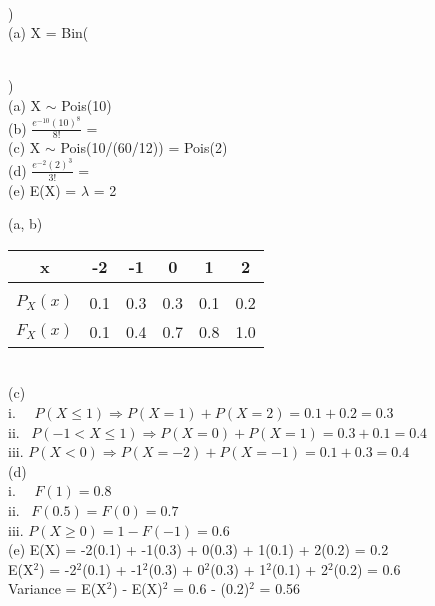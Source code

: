 \documentclass[12pt]{article}
\begin{document}
\noindent \hrulefill \\
\pagebreak


)\\
\indent (a) X = Bin(


\noindent \hrulefill \\


)\\
\indent (a) X $\sim$ Pois(10)\\

\indent (b) {\Large $\frac{e^{-10}(10)^8}{8!}$} = \\

\indent (c) X $\sim$ Pois(10/(60/12)) = Pois(2)\\

\indent (d) {\Large $\frac{e^{-2}(2)^3}{3!}$} = \\

\indent (e) E(X) = $\lambda$ = 2\\


\pagebreak
\pagebreak

\indent (a, b) 
\begin{tabular}{c|ccccc}
 x & -2 & -1 & 0 & 1 & 2 \\
 \hline &&&&&\\[-1em]
$P_X(x)$ & 0.1 & 0.3 & 0.3 & 0.1 & 0.2\\
$F_X(x)$ & 0.1 & 0.4 & 0.7 & 0.8 & 1.0\\
\end{tabular}\\


\indent (c) \\
\indent \indent i. \ \ $P(X\le 1) \Rightarrow P(X = 1) + P(X = 2) = 0.1+0.2 = 0.3$\\[.4em]
\indent \indent ii. \ $P(-1 < X \le 1) \Rightarrow P(X=0)+P(X=1) = 0.3+0.1 = 0.4$\\[.4em]
\indent \indent iii. $P(X < 0) \Rightarrow P(X=-2)+P(X=-1) = 0.1+0.3 = 0.4$\\

\indent (d) \\
\indent \indent i. \ \ $F(1) = 0.8$\\[.4em]
\indent \indent ii. \ $F(0.5) = F(0) = 0.7$\\[.4em]
\indent \indent iii. $P(X \ge 0) = 1-F(-1) = 0.6$\\

\indent (e) E(X) = -2(0.1) + -1(0.3) + 0(0.3) + 1(0.1) + 2(0.2) = 0.2\\[.4em]
\indent \indent E(X$^2$) = -2$^2$(0.1) + -1$^2$(0.3) + 0$^2$(0.3) + 1$^2$(0.1) + 2$^2$(0.2) = 0.6\\[.4em]
\indent \indent Variance = E(X$^2$) - E(X)$^2$ = 0.6 - (0.2)$^2$ = 0.56\\
\end{document}
